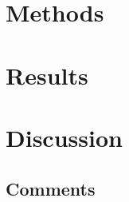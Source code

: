 \documentclass[
]{book}
\begin{document}
\hypertarget{methods}{%
\section{Methods}\label{methods}}

\hypertarget{results}{%
\section{Results}\label{results}}

\hypertarget{discussion}{%
\section{Discussion}\label{discussion}}

\hypertarget{comments}{%
\subsection{Comments}\label{comments}}

  
\end{document}
